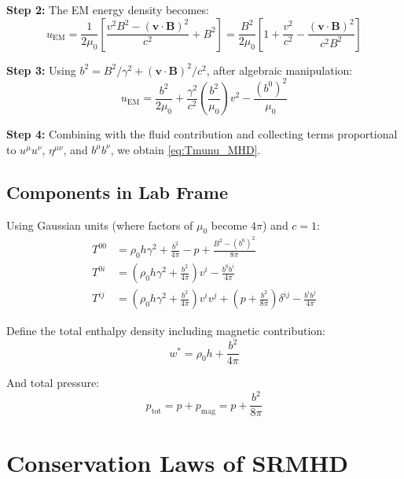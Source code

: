 \documentclass[12pt,a4paper]{article}
\begin{document}
\textbf{Step 2:} The EM energy density becomes:
\begin{equation}
u_\text{EM} = \frac{1}{2\mu_0}\left[\frac{v^2 B^2 - (\bm{v} \cdot \bm{B})^2}{c^2} + B^2\right]
= \frac{B^2}{2\mu_0}\left[1 + \frac{v^2}{c^2} - \frac{(\bm{v} \cdot \bm{B})^2}{c^2 B^2}\right]
\end{equation}

\textbf{Step 3:} Using $b^2 = B^2/\gamma^2 + (\bm{v} \cdot \bm{B})^2/c^2$, after algebraic
manipulation:
\begin{equation}
u_\text{EM} = \frac{b^2}{2\mu_0} + \frac{\gamma^2}{c^2}\left(\frac{b^2}{\mu_0}\right)v^2
- \frac{(b^0)^2}{\mu_0}
\end{equation}

\textbf{Step 4:} Combining with the fluid contribution and collecting terms proportional
to $u^\mu u^\nu$, $\eta^{\mu\nu}$, and $b^\mu b^\nu$, we obtain \eqref{eq:Tmunu_MHD}.

\subsection{Components in Lab Frame}

Using Gaussian units (where factors of $\mu_0$ become $4\pi$) and $c = 1$:
\begin{align}
T^{00} &= \rho_0 h \gamma^2 + \frac{b^2}{4\pi} - p + \frac{B^2 - (b^0)^2}{8\pi}
\label{eq:T00_lab} \\
T^{0i} &= \left(\rho_0 h \gamma^2 + \frac{b^2}{4\pi}\right)v^i - \frac{b^0 b^i}{4\pi}
\label{eq:T0i_lab} \\
T^{ij} &= \left(\rho_0 h \gamma^2 + \frac{b^2}{4\pi}\right)v^i v^j
+ \left(p + \frac{b^2}{8\pi}\right)\delta^{ij} - \frac{b^i b^j}{4\pi}
\label{eq:Tij_lab}
\end{align}

Define the total enthalpy density including magnetic contribution:
\begin{equation}
w^* = \rho_0 h + \frac{b^2}{4\pi}
\label{eq:total_enthalpy}
\end{equation}

And total pressure:
\begin{equation}
p_\text{tot} = p + p_\text{mag} = p + \frac{b^2}{8\pi}
\label{eq:total_pressure_def}
\end{equation}

\section{Conservation Laws of SRMHD}
\end{document}
